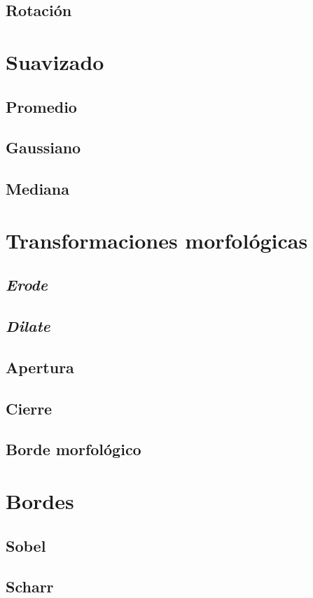 \subsection{Rotación}

\section{Suavizado}
\subsection{Promedio}
\subsection{Gaussiano}
\subsection{Mediana}

\section{Transformaciones morfológicas}
\subsection{\emph{Erode}}
\subsection{\emph{Dilate}}
\subsection{Apertura}
\subsection{Cierre}
\subsection{Borde morfológico}

\section{Bordes}
\subsection{Sobel}
\subsection{Scharr}
